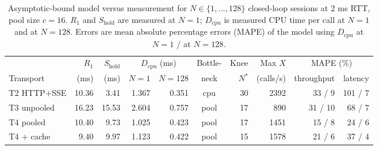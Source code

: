 \begin{table}[t]
\centering
\caption{Asymptotic-bound model versus measurement for $N \in \{1,\dots,128\}$ closed-loop sessions at 2 ms RTT, pool size $c = 16$. $R_1$ and $S_{\mathrm{hold}}$ are measured at $N=1$; $D_{\mathrm{cpu}}$ is measured CPU time per call at $N=1$ and at $N=128$. Errors are mean absolute percentage errors (MAPE) of the model using $D_{\mathrm{cpu}}$ at $N=1$ / at $N=128$.}
\label{tab:model}
\begin{tabular}{l rr rr c r r rr}
\toprule
 & $R_1$ & $S_{\mathrm{hold}}$ & \multicolumn{2}{c}{$D_{\mathrm{cpu}}$ (ms)} & Bottle- & Knee & Max $X$ & \multicolumn{2}{c}{MAPE (\%)} \\
\cmidrule(lr){4-5}\cmidrule(lr){9-10}
Transport & (ms) & (ms) & $N{=}1$ & $N{=}128$ & neck & $N^*$ & (calls/s) & throughput & latency \\
\midrule
T2 HTTP+SSE & 10.36 & 3.41 & 1.367 & 0.351 & cpu & 30 & 2392 & 33 / 9 & 101 / 7 \\
T3 unpooled & 16.23 & 15.53 & 2.604 & 0.757 & pool & 17 & 890 & 31 / 10 & 68 / 7 \\
T4 pooled & 10.40 & 9.73 & 1.025 & 0.423 & pool & 17 & 1451 & 15 / 8 & 24 / 6 \\
T4 + cache & 9.40 & 9.97 & 1.123 & 0.422 & pool & 15 & 1578 & 21 / 6 & 37 / 4 \\
\bottomrule
\end{tabular}
\end{table}
